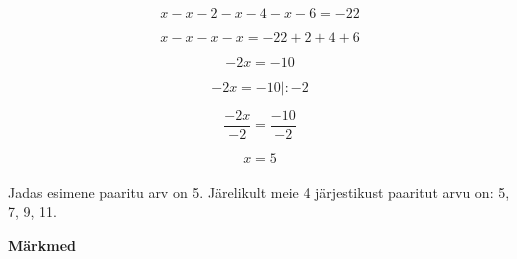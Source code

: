 \begin{center}
{{{\begin{flushleft}
\begin{equation}
\label{eq14_1}
x-x-2-x-4-x-6=-22
\end{equation}

\begin{equation}
\label{eq14_2}
x-x-x-x=-22+2+4+6
\end{equation}

\begin{equation}
\label{eq14_3}
-2x=-10
\end{equation}

\begin{equation}
\label{eq14_4}
-2x=-10 \bigg| : -2
\end{equation}

\begin{equation}
\label{eq14_5}
\dfrac{-2x}{-2}=\dfrac{-10}{-2}
\end{equation}

\begin{equation}
\label{eq14_6}
x=5
\end{equation}\\
\vspace{2mm}
\hspace{5mm}
Jadas esimene paaritu arv on 5. Järelikult meie 4 järjestikust paaritut arvu on: 5, 7, 9, 11.
\end{flushleft}
}}}
\end{center}


\vspace{0.5cm}

\textbf{Märkmed}\\
\vspace{2mm}
\begin{mdframed}[style=graphpaper]
\vspace{3cm}
\end{mdframed}
